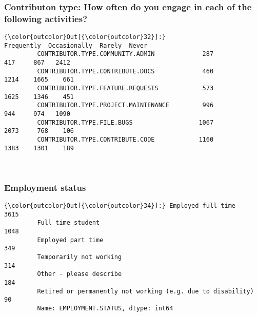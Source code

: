 \documentclass[11pt]{article}
\begin{document}
    \subsubsection{Contributon type: How often do you engage in each of the
following
activities?}\label{contributon-type-how-often-do-you-engage-in-each-of-the-following-activities}


            \begin{Verbatim}[commandchars=\\\{\}]
{\color{outcolor}Out[{\color{outcolor}32}]:}                                       Frequently  Occasionally  Rarely  Never
         CONTRIBUTOR.TYPE.COMMUNITY.ADMIN             287           417     867   2412
         CONTRIBUTOR.TYPE.CONTRIBUTE.DOCS             460          1214    1665    661
         CONTRIBUTOR.TYPE.FEATURE.REQUESTS            573          1625    1346    451
         CONTRIBUTOR.TYPE.PROJECT.MAINTENANCE         996           944     974   1090
         CONTRIBUTOR.TYPE.FILE.BUGS                  1067          2073     768    106
         CONTRIBUTOR.TYPE.CONTRIBUTE.CODE            1160          1383    1301    189
\end{Verbatim}
        

    \begin{center}
    \end{center}
    { \hspace*{\fill} \\}
    
    \subsubsection{Employment status}\label{employment-status}


            \begin{Verbatim}[commandchars=\\\{\}]
{\color{outcolor}Out[{\color{outcolor}34}]:} Employed full time                                             3615
         Full time student                                              1048
         Employed part time                                              349
         Temporarily not working                                         314
         Other - please describe                                         184
         Retired or permanently not working (e.g. due to disability)      90
         Name: EMPLOYMENT.STATUS, dtype: int64
\end{Verbatim}
        
\end{document}
